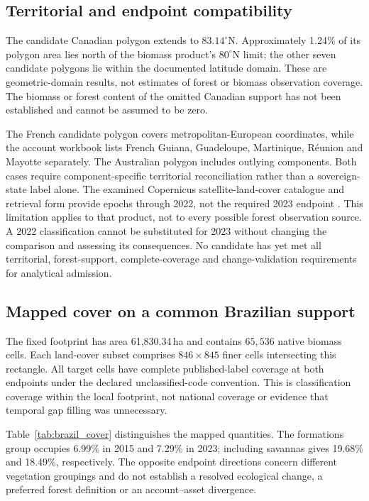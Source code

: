 \documentclass[11pt,a4paper]{article}
\begin{document}
\subsection{Territorial and endpoint compatibility}
The candidate Canadian polygon extends to $83.14^\circ$N. Approximately 1.24\% of its polygon area lies north of the biomass product's $80^\circ$N limit; the other seven candidate polygons lie within the documented latitude domain. These are geometric-domain results, not estimates of forest or biomass observation coverage. The biomass or forest content of the omitted Canadian support has not been established and cannot be assumed to be zero.

The French candidate polygon covers metropolitan-European coordinates, while the account workbook lists French Guiana, Guadeloupe, Martinique, R\'eunion and Mayotte separately. The Australian polygon includes outlying components. Both cases require component-specific territorial reconciliation rather than a sovereign-state label alone. The examined Copernicus satellite-land-cover catalogue and retrieval form provide epochs through 2022, not the required 2023 endpoint \citep{CDS2026}. This limitation applies to that product, not to every possible forest observation source. A 2022 classification cannot be substituted for 2023 without changing the comparison and assessing its consequences. No candidate has yet met all territorial, forest-support, complete-coverage and change-validation requirements for analytical admission.

\subsection{Mapped cover on a common Brazilian support}
The fixed footprint has area 61,830.34\,ha and contains $65{,}536$ native biomass cells. Each land-cover subset comprises $846\times845$ finer cells intersecting this rectangle. All target cells have complete published-label coverage at both endpoints under the declared unclassified-code convention. This is classification coverage within the local footprint, not national coverage or evidence that temporal gap filling was unnecessary.

Table~\ref{tab:brazil_cover} distinguishes the mapped quantities. The formations group occupies 6.99\% in 2015 and 7.29\% in 2023; including savannas gives 19.68\% and 18.49\%, respectively. The opposite endpoint directions concern different vegetation groupings and do not establish a resolved ecological change, a preferred forest definition or an account--asset divergence.
\end{document}
